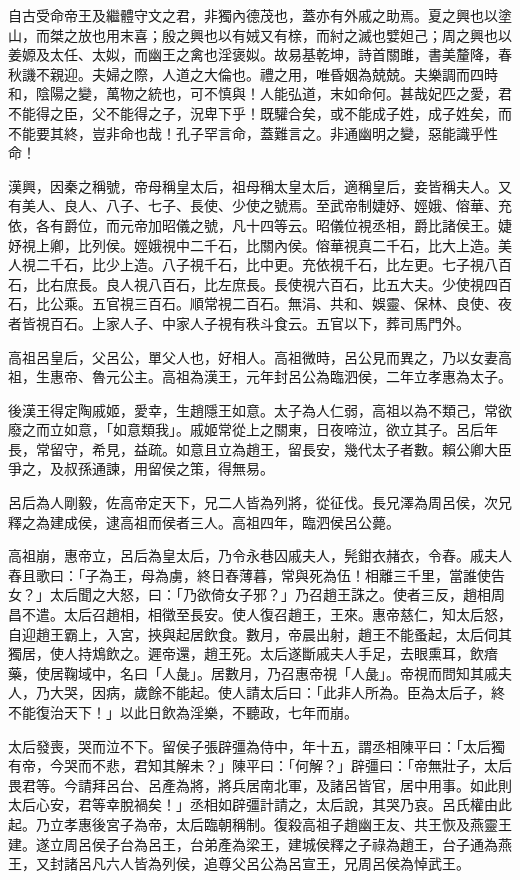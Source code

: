
\begin{pinyinscope}
自古受命帝王及繼體守文之君，非獨內德茂也，蓋亦有外戚之助焉。夏之興也以塗山，而桀之放也用末喜；殷之興也以有娀又有榇，而紂之滅也嬖妲己；周之興也以姜嫄及太任、太姒，而幽王之禽也淫褒姒。故易基乾坤，詩首關雎，書美釐降，春秋譏不親迎。夫婦之際，人道之大倫也。禮之用，唯昏姻為兢兢。夫樂調而四時和，陰陽之變，萬物之統也，可不慎與！人能弘道，末如命何。甚哉妃匹之愛，君不能得之臣，父不能得之子，況卑下乎！既驩合矣，或不能成子姓，成子姓矣，而不能要其終，豈非命也哉！孔子罕言命，蓋難言之。非通幽明之變，惡能識乎性命！

漢興，因秦之稱號，帝母稱皇太后，祖母稱太皇太后，適稱皇后，妾皆稱夫人。又有美人、良人、八子、七子、長使、少使之號焉。至武帝制婕妤、娙娥、傛華、充依，各有爵位，而元帝加昭儀之號，凡十四等云。昭儀位視丞相，爵比諸侯王。婕妤視上卿，比列侯。娙娥視中二千石，比關內侯。傛華視真二千石，比大上造。美人視二千石，比少上造。八子視千石，比中更。充依視千石，比左更。七子視八百石，比右庶長。良人視八百石，比左庶長。長使視六百石，比五大夫。少使視四百石，比公乘。五官視三百石。順常視二百石。無涓、共和、娛靈、保林、良使、夜者皆視百石。上家人子、中家人子視有秩斗食云。五官以下，葬司馬門外。

高祖呂皇后，父呂公，單父人也，好相人。高祖微時，呂公見而異之，乃以女妻高祖，生惠帝、魯元公主。高祖為漢王，元年封呂公為臨泗侯，二年立孝惠為太子。

後漢王得定陶戚姬，愛幸，生趙隱王如意。太子為人仁弱，高祖以為不類己，常欲廢之而立如意，「如意類我」。戚姬常從上之關東，日夜啼泣，欲立其子。呂后年長，常留守，希見，益疏。如意且立為趙王，留長安，幾代太子者數。賴公卿大臣爭之，及叔孫通諫，用留侯之策，得無易。

呂后為人剛毅，佐高帝定天下，兄二人皆為列將，從征伐。長兄澤為周呂侯，次兄釋之為建成侯，逮高祖而侯者三人。高祖四年，臨泗侯呂公薨。

高祖崩，惠帝立，呂后為皇太后，乃令永巷囚戚夫人，髡鉗衣赭衣，令舂。戚夫人舂且歌曰：「子為王，母為虜，終日舂薄暮，常與死為伍！相離三千里，當誰使告女？」太后聞之大怒，曰：「乃欲倚女子邪？」乃召趙王誅之。使者三反，趙相周昌不遣。太后召趙相，相徵至長安。使人復召趙王，王來。惠帝慈仁，知太后怒，自迎趙王霸上，入宮，挾與起居飲食。數月，帝晨出射，趙王不能蚤起，太后伺其獨居，使人持鴆飲之。遲帝還，趙王死。太后遂斷戚夫人手足，去眼熏耳，飲瘖藥，使居鞠域中，名曰「人彘」。居數月，乃召惠帝視「人彘」。帝視而問知其戚夫人，乃大哭，因病，歲餘不能起。使人請太后曰：「此非人所為。臣為太后子，終不能復治天下！」以此日飲為淫樂，不聽政，七年而崩。

太后發喪，哭而泣不下。留侯子張辟彊為侍中，年十五，謂丞相陳平曰：「太后獨有帝，今哭而不悲，君知其解未？」陳平曰：「何解？」辟彊曰：「帝無壯子，太后畏君等。今請拜呂台、呂產為將，將兵居南北軍，及諸呂皆官，居中用事。如此則太后心安，君等幸脫禍矣！」丞相如辟彊計請之，太后說，其哭乃哀。呂氏權由此起。乃立孝惠後宮子為帝，太后臨朝稱制。復殺高祖子趙幽王友、共王恢及燕靈王建。遂立周呂侯子台為呂王，台弟產為梁王，建城侯釋之子祿為趙王，台子通為燕王，又封諸呂凡六人皆為列侯，追尊父呂公為呂宣王，兄周呂侯為悼武王。


\end{pinyinscope}
